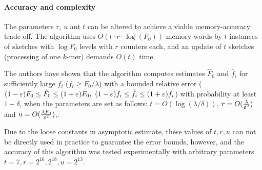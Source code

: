 \paragraph{Accuracy and complexity}
The parameters $r$, $u$ ant $t$ can be altered to achieve a viable memory-accuracy trade-off.
The algorithm uses $O(t \cdot r \cdot \log(F_0))$ memory words by $t$ instances of sketches with $\log F_0$ levels with $r$ counters each,
and an update of $t$ sketches (processing of one $k$-mer) demands $O(t)$ time.

The authors have shown that the algorithm computes estimates $\hat F_0$ and $\hat f_i$ for sufficiently large $f_i$ ($f_i \geq F_0 / \lambda$)
with a bounded relative error ($(1-\varepsilon)F_0 \leq \hat F_0 \leq (1+\varepsilon)F_0,~ (1-\varepsilon)f_i \leq \hat f_i \leq (1+\varepsilon)f_i$) with
probability at least $1 - \delta$, when the parameters are set as follows: $t = O(\log(\lambda/\delta))$, $r = O(\frac{\lambda}{\varepsilon^2})$ and $u = O(\frac{\lambda F_0}{\varepsilon^2})$,. 

Due to the loose constants in asymptotic estimate, these values of $t, r, u$ can not be directly used in practice to guarantee the error bounds, however,
and the accuracy of this algorithm was tested experimentally with arbitrary parameters $t=7, r=2^{16}, 2^{18}, u=2^{13}$.

